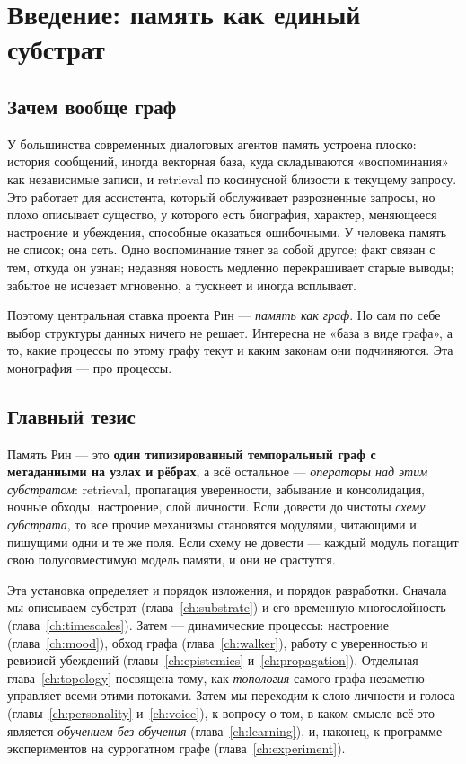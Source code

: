 \chapter{Введение: память как единый субстрат}

\section{Зачем вообще граф}

У большинства современных диалоговых агентов память устроена плоско: история
сообщений, иногда векторная база, куда складываются «воспоминания» как
независимые записи, и retrieval по косинусной близости к текущему запросу. Это
работает для ассистента, который обслуживает разрозненные запросы, но плохо
описывает существо, у которого есть биография, характер, меняющееся настроение
и убеждения, способные оказаться ошибочными. У человека память не список; она
сеть. Одно воспоминание тянет за собой другое; факт связан с тем, откуда он
узнан; недавняя новость медленно перекрашивает старые выводы; забытое не
исчезает мгновенно, а тускнеет и иногда всплывает.

Поэтому центральная ставка проекта Рин — \emph{память как граф}. Но сам по себе
выбор структуры данных ничего не решает. Интересна не «база в виде графа», а то,
какие процессы по этому графу текут и каким законам они подчиняются. Эта
монография — про процессы.

\section{Главный тезис}

\begin{intuition}
Память Рин — это \textbf{один типизированный темпоральный граф с метаданными на
узлах и рёбрах}, а всё остальное — \emph{операторы над этим субстратом}:
retrieval, пропагация уверенности, забывание и консолидация, ночные обходы,
настроение, слой личности. Если довести до чистоты \emph{схему субстрата}, то
все прочие механизмы становятся модулями, читающими и пишущими одни и те же
поля. Если схему не довести — каждый модуль потащит свою полусовместимую модель
памяти, и они не срастутся.
\end{intuition}

Эта установка определяет и порядок изложения, и порядок разработки. Сначала мы
описываем субстрат (глава~\ref{ch:substrate}) и его временную многослойность
(глава~\ref{ch:timescales}). Затем — динамические процессы: настроение
(глава~\ref{ch:mood}), обход графа (глава~\ref{ch:walker}), работу с
уверенностью и ревизией убеждений (главы~\ref{ch:epistemics}
и~\ref{ch:propagation}). Отдельная глава~\ref{ch:topology} посвящена тому, как
\emph{топология} самого графа незаметно управляет всеми этими потоками. Затем мы
переходим к слою личности и голоса (главы~\ref{ch:personality}
и~\ref{ch:voice}), к вопросу о том, в каком смысле всё это является
\emph{обучением без обучения} (глава~\ref{ch:learning}), и, наконец, к программе
экспериментов на суррогатном графе (глава~\ref{ch:experiment}).

